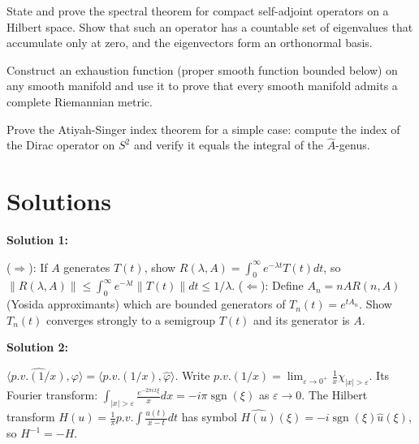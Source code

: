 \documentclass[12pt,a4paper]{exam}
\begin{document}
\begin{questions}
\vspace{0.3cm}

\question[5]
State and prove the spectral theorem for compact self-adjoint operators on a Hilbert space. Show that such an operator has a countable set of eigenvalues that accumulate only at zero, and the eigenvectors form an orthonormal basis.

\vspace{0.3cm}

\question[2]
Construct an exhaustion function (proper smooth function bounded below) on any smooth manifold and use it to prove that every smooth manifold admits a complete Riemannian metric.

\vspace{0.3cm}

\question[5]
Prove the Atiyah-Singer index theorem for a simple case: compute the index of the Dirac operator on $S^2$ and verify it equals the integral of the $\widehat{A}$-genus.

\vspace{0.3cm}

\end{questions}

\newpage
\section*{Solutions}

\textbf{Solution 1:}

($\Rightarrow$): If $A$ generates $T(t)$, show $R(\lambda,A) = \int_0^\infty e^{-\lambda t} T(t) dt$, so $\|R(\lambda,A)\| \leq \int_0^\infty e^{-\lambda t} \|T(t)\| dt \leq 1/\lambda$. ($\Leftarrow$): Define $A_n = nAR(n,A)$ (Yosida approximants) which are bounded generators of $T_n(t) = e^{t A_n}$. Show $T_n(t)$ converges strongly to a semigroup $T(t)$ and its generator is $A$.

\vspace{0.5cm}

\textbf{Solution 2:}

$\langle \widehat{p.v.(1/x)}, \varphi \rangle = \langle p.v.(1/x), \widehat{\varphi} \rangle$. Write $p.v.(1/x) = \lim_{\varepsilon \to 0^+} \frac{1}{x} \chi_{|x|>\varepsilon}$. Its Fourier transform: $\int_{|x|>\varepsilon} \frac{e^{-2\pi i x \xi}}{x} dx = -i\pi \operatorname{sgn}(\xi)$ as $\varepsilon \to 0$. The Hilbert transform $H(u) = \frac{1}{\pi} p.v. \int \frac{u(t)}{x-t} dt$ has symbol $\widehat{H(u)}(\xi) = -i \operatorname{sgn}(\xi) \widehat{u}(\xi)$, so $H^{-1} = -H$.
\end{document}
